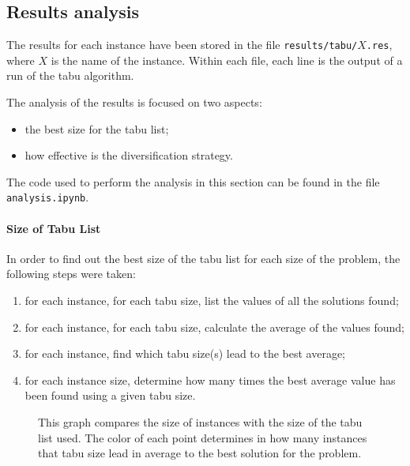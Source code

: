\documentclass{article}
\begin{document}
\subsection{Results analysis}
The results for each instance have been stored in the file \texttt{results/tabu/$X$.res}, where $X$ is the name of the instance.
Within each file, each line is the output of a run of the tabu algorithm.

The analysis of the results is focused on two aspects:
\begin{itemize}
    \item the best size for the tabu list;
    \item how effective is the diversification strategy.
\end{itemize}

The code used to perform the analysis in this section can be found in the file \texttt{analysis.ipynb}.

\paragraph{Size of Tabu List}
In order to find out the best size of the tabu list for each size of the problem, the following steps were taken:
\begin{enumerate}
    \item for each instance, for each tabu size, list the values of all the solutions found;
    \item for each instance, for each tabu size, calculate the average of the values found;
    \item for each instance, find which tabu size(s) lead to the best average;
    \item for each instance size, determine how many times the best average value has been found using a given tabu size.
\end{enumerate}

\begin{figure}
    \centering
    \caption{
        This graph compares the size of instances with the size of the tabu list used.
        The color of each point determines in how many instances that tabu size lead in average to the best solution for the problem.
    }
    \label{fig:tabu}
\end{figure}
\end{document}
